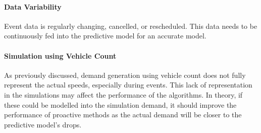 \paragraph{Data Variability} Event data is regularly changing, cancelled, or rescheduled. This data needs to be continuously fed into the predictive model for an accurate model.

\paragraph{Simulation using Vehicle Count} As previously discussed, demand generation using vehicle count does not fully represent the actual speeds, especially during events. This lack of representation in the simulations may affect the performance of the algorithms. In theory, if these could be modelled into the simulation demand, it should improve the performance of proactive methods as the actual demand will be closer to the predictive model’s drops.

